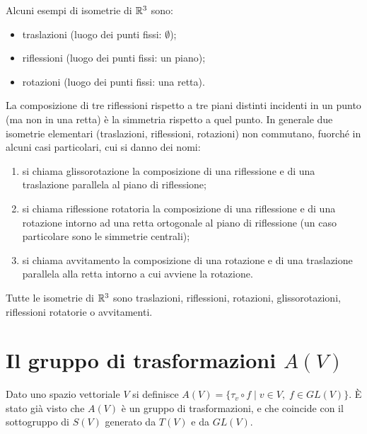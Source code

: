 \documentclass[a4paper,12pt]{article}
\newcommand{\Got}[1]{#1}
\newcommand{\got}[1]{{#1}}
\begin{document}
 \Got{Alcuni esempi di isometrie di} $\got{\R^3}$ \Got{sono:}
 \begin{itemize}
  \item \Got{traslazioni (luogo dei punti fissi:} $\got{\emptyset}$);
  \item \Got{riflessioni (luogo dei punti fissi: un piano);}
  \item \Got{rotazioni (luogo dei punti fissi: una retta).}
 \end{itemize}
 \begin{remark}
 \Got{La composizione di tre riflessioni rispetto a tre piani distinti incidenti in un punto (ma non in una retta)
 è la simmetria rispetto a quel punto.
 In generale due isometrie elementari (traslazioni, riflessioni, rotazioni) non commutano, fuorché in alcuni casi particolari,
 cui si danno dei nomi:}
 \begin{enumerate}[label=\bf\Roman*)]
  \item  \Got{si chiama glissorotazione la composizione di una riflessione e di una traslazione parallela al piano di riflessione;}
  \item \Got{si chiama riflessione rotatoria la composizione di una riflessione e di una rotazione intorno ad una retta ortogonale
  al piano di riflessione (un caso particolare sono le simmetrie centrali);}
  \item \Got{si chiama avvitamento la composizione di una rotazione e di una traslazione parallela alla retta intorno a cui
  avviene la rotazione.}
 \end{enumerate}
 \end{remark}
 \begin{theorem}
 \Got{Tutte le isometrie di} $\got{\R^3}$ \Got{sono traslazioni, riflessioni, rotazioni, glissorotazioni, riflessioni rotatorie
 o avvitamenti.}
 \end{theorem}
 
  \section{Il gruppo di trasformazioni $\got{A(V)}$}
 \Got{Dato uno spazio vettoriale} $\got{V}$ \Got{si definisce} $\got{A(V)=\{\tau_v}\circ\got{ f\;|\; v\in V,\; f\in GL(V)\}}$.
 \Got{È stato già visto che} $\got{A(V)}$ \Got{è un gruppo di trasformazioni, e che coincide con il sottogruppo di} $\got{S(V)}$
 \Got{generato da} $\got{T(V)}$ \Got{e da} $\got{GL(V)}$.
 
 \vspace{0.5cm}
 
\end{document}
